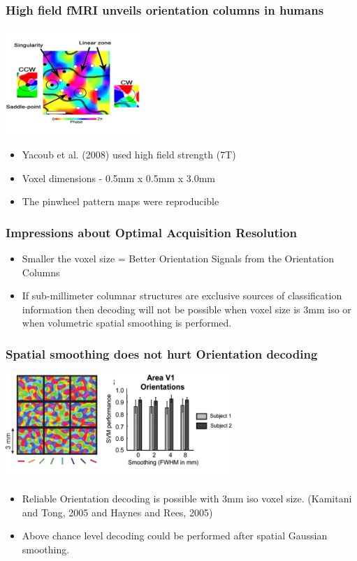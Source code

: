 \documentclass{beamer}
\begin{document}
  \begin{frame}
    \frametitle{High field fMRI unveils orientation columns in humans}
        \begin{center}
            \includegraphics[height=4cm]{pics/Yacoub_pinwheel}
        \end{center}
        \begin{itemize}
            \item Yacoub et al. (2008) used high field strength (7T)
            \item Voxel dimensions - 0.5mm x 0.5mm x 3.0mm
            \item The pinwheel pattern maps were reproducible
        \end{itemize}  
    \end{frame}

  \begin{frame}
    \frametitle{Impressions about Optimal Acquisition Resolution}
        \begin{itemize}
            \item Smaller the voxel size = Better Orientation Signals from the Orientation Columns
            \item If sub-millimeter columnar structures are exclusive sources of classification information 
            then decoding will not be possible when voxel size is 3mm iso or when volumetric spatial 
            smoothing is performed.
        \end{itemize}  
    \end{frame}


  \begin{frame}
    \frametitle{Spatial smoothing does not hurt Orientation decoding}
        \begin{center}
            \includegraphics[height=4cm]{pics/grid_3mm_op_de_beeck}
        \end{center}
        \begin{itemize}
            \item Reliable Orientation decoding is possible with 3mm iso voxel size. (Kamitani and Tong, 2005 and Haynes and Rees, 2005)
            \item Above chance level decoding could be performed after spatial Gaussian smoothing.
        \end{itemize}  
    \end{frame}
\end{document}
